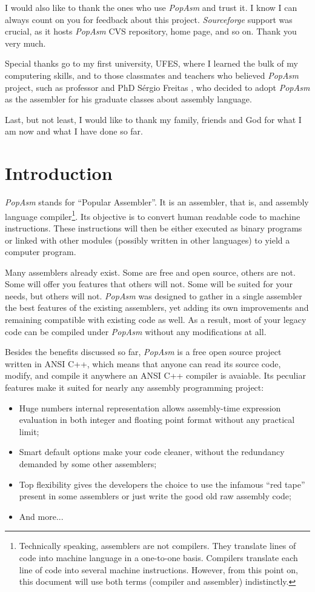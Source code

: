 \documentclass[a4paper,12pt]{book}
\begin{document}
I would also like to thank the ones who use \emph{PopAsm} and trust it. I know I can always count on you for
feedback about this project. \emph{Sourceforge} support was crucial, as it hosts \emph{PopAsm} CVS repository,
home page, and so on. Thank you very much.

Special thanks go to my first university, UFES\cite{UFES}, where I learned the bulk of my computering skills, and
to those classmates and teachers who believed \emph{PopAsm} project, such as professor and PhD S\'ergio Freitas%
\cite{FREITAS}, who decided to adopt \emph{PopAsm} as the assembler for his graduate classes about assembly
language.

Last, but not least, I would like to thank my family, friends and God for what I am now and what I have done so far.

\chapter{Introduction}
\emph{PopAsm} stands for ``Popular Assembler''. It is an assembler, that is, and assembly language compiler\footnote{Technically
speaking, assemblers are not compilers. They translate lines of code into machine language in a one-to-one basis. Compilers
translate each line of code into several machine instructions. However, from this point on, this document will use both
terms (compiler and assembler) indistinctly.}. Its objective is to convert human readable code to machine instructions.
These instructions will then be either executed as binary programs or linked with other modules (possibly written in
other languages) to yield a computer program.

Many assemblers already exist. Some are free and open source, others are not. Some will offer you features that others
will not. Some will be suited for your needs, but others will not. \emph{PopAsm} was designed to gather in a single
assembler the best features of the existing assemblers, yet adding its own improvements and remaining compatible with
existing code as well. As a result, most of your legacy code can be compiled under \emph{PopAsm} without any modifications
at all.

Besides the benefits discussed so far, \emph{PopAsm} is a free open source project written in ANSI C++, which means
that anyone can read its source code, modify, and compile it anywhere an ANSI C++ compiler is avaiable. Its peculiar
features make it suited for nearly any assembly programming project:

\begin{itemize}
	\item{Huge numbers internal representation} allows assembly-time expression evaluation in both integer and floating
		point format without any practical limit;
   \item{Smart default options} make your code cleaner, without the redundancy demanded by some other assemblers;
	\item{Top flexibility} gives the developers the choice to use the infamous ``red tape'' present in some assemblers
		or just write the good old raw assembly code;
	\item{And more...}
\end{itemize}
\end{document}
